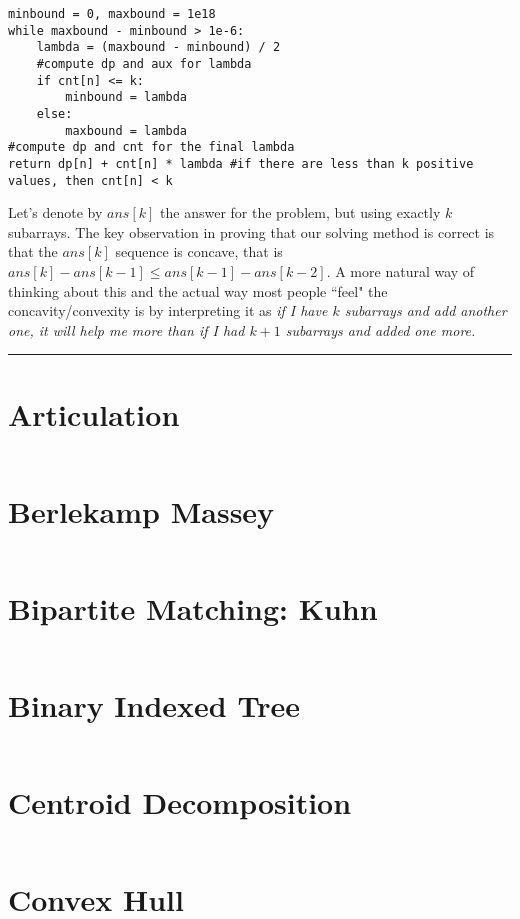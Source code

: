 \documentclass{article}
\begin{document}
\begin{multicols}{3}[
	\maketitle
    \begin{center}
        \rule{\textwidth}{2pt}
    \end{center}
]
\begin{verbatim}
minbound = 0, maxbound = 1e18
while maxbound - minbound > 1e-6:
    lambda = (maxbound - minbound) / 2
    #compute dp and aux for lambda
    if cnt[n] <= k:
        minbound = lambda
    else:
        maxbound = lambda
#compute dp and cnt for the final lambda
return dp[n] + cnt[n] * lambda #if there are less than k positive values, then cnt[n] < k
\end{verbatim}
Let's denote by $ans[k]$ the answer for the problem, but using exactly $k$ subarrays. The key observation in proving that our solving method is correct is that the $ans[k]$ sequence is concave, that is $ans[k] - ans[k - 1]\le ans[k - 1] - ans[k - 2]$. A more natural way of thinking about this and the actual way most people ``feel" the concavity/convexity is by interpreting it as \textit{if I have $k$ subarrays and add another one, it will help me more than if I had $k+1$ subarrays and added one more.} \vspace{0.2cm} \hrule \vspace{0.5cm}

\section{Articulation}
\inputminted{cpp}{src/Articulation.cc}

\section{Berlekamp Massey}
\inputminted{cpp}{src/BerlekampMassey.cpp}

\section{Bipartite Matching: Kuhn}
\inputminted{cpp}{src/BipartiteMatchingKuhn.cc}

\section{Binary Indexed Tree}
\inputminted{cpp}{src/BIT.cc}

\section{Centroid Decomposition}
\inputminted{cpp}{src/CentroidDecomposition.cpp}

\section{Convex Hull}
\inputminted{cpp}{src/ConvexHull.cc}


\end{multicols}
\end{document}
